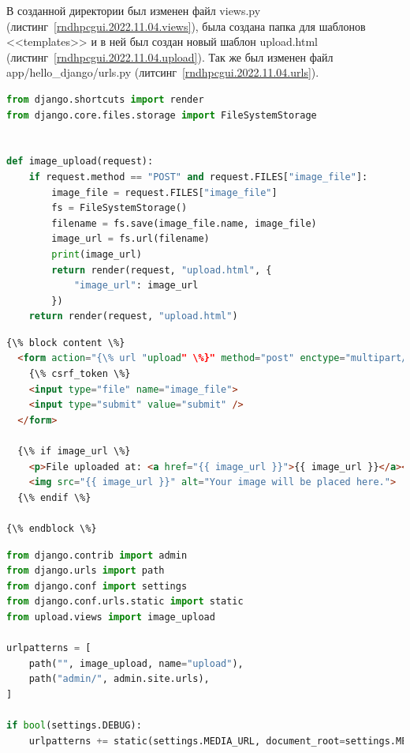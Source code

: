 В созданной директории был изменен файл views.py (листинг~\ref{rndhpcgui.2022.11.04.views}), была создана папка для шаблонов <<templates>> и в ней был создан новый шаблон \textsf{upload.html} (листинг~\ref{rndhpcgui.2022.11.04.upload}). Так же был изменен файл \textsf{app/hello_django/urls.py} (литсинг~\ref{rndhpcgui.2022.11.04.urls}).

\begin{lstlisting}[frame=single, label={rndhpcgui.2022.11.04.views}, caption={views.py}, language=Python] 
from django.shortcuts import render
from django.core.files.storage import FileSystemStorage


def image_upload(request):
    if request.method == "POST" and request.FILES["image_file"]:
        image_file = request.FILES["image_file"]
        fs = FileSystemStorage()
        filename = fs.save(image_file.name, image_file)
        image_url = fs.url(filename)
        print(image_url)
        return render(request, "upload.html", {
            "image_url": image_url
        })
    return render(request, "upload.html")
\end{lstlisting}

\begin{lstlisting}[frame=single, label={rndhpcgui.2022.11.04.upload}, caption={\textsf{upload.html}}, language=HTML] 
{\% block content \%}
  <form action="{\% url "upload" \%}" method="post" enctype="multipart/form-data">
    {\% csrf_token \%}
    <input type="file" name="image_file">
    <input type="submit" value="submit" />
  </form>

  {\% if image_url \%}
    <p>File uploaded at: <a href="{{ image_url }}">{{ image_url }}</a></p>
    <img src="{{ image_url }}" alt="Your image will be placed here.">
  {\% endif \%}

{\% endblock \%}
\end{lstlisting}

\begin{lstlisting}[frame=single, label={rndhpcgui.2022.11.04.urls}, caption={\textsf{urls.py}}, language=Python] 
from django.contrib import admin
from django.urls import path
from django.conf import settings
from django.conf.urls.static import static
from upload.views import image_upload

urlpatterns = [
    path("", image_upload, name="upload"),
    path("admin/", admin.site.urls),
]

if bool(settings.DEBUG):
    urlpatterns += static(settings.MEDIA_URL, document_root=settings.MEDIA_ROOT)
\end{lstlisting}

